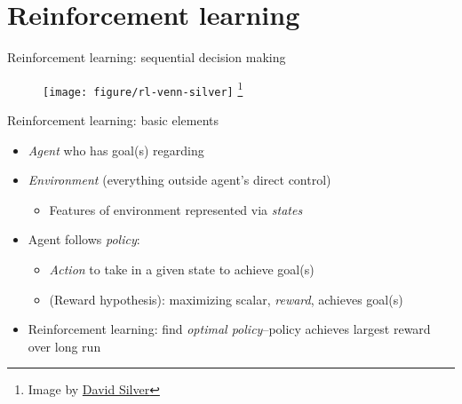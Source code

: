 \documentclass[handout]{beamer}
\newcommand\blfootnote[1]{%
  \begingroup
  \renewcommand\thefootnote{}\footnote{#1}%
  \addtocounter{footnote}{-1}%
  \endgroup
}
\begin{document}
\section{Reinforcement learning} %
\label{sec:reinforcement_learning}

\begin{frame}[c]{Reinforcement learning: sequential decision making}
  \begin{figure}
    \centering
    \texttt{[image: figure/rl-venn-silver]}
    \blfootnote{\scriptsize Image by \href{http://www0.cs.ucl.ac.uk/staff/D.Silver/web/Teaching.html}{David Silver}}
  \end{figure}
\end{frame}

\begin{frame}[c]{Reinforcement learning: basic elements}

\begin{itemize}[<+->]
  \item \emph{Agent} who has goal(s) regarding
  \item \emph{Environment} (everything outside agent's direct control)
  \begin{itemize}
    \item Features of environment represented via \emph{states}
  \end{itemize}
  \item Agent follows \emph{policy}: 
  \begin{itemize}
    \item \emph{Action} to take in a given state to achieve goal(s)
    \item (Reward hypothesis): maximizing scalar, \emph{reward}, achieves goal(s) 
  \end{itemize}
  \item Reinforcement learning: find \emph{optimal policy}--policy achieves largest reward over long run 
\end{itemize}

\end{frame}
\end{document}
